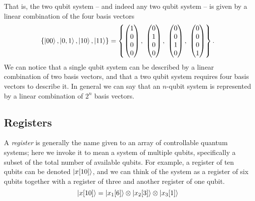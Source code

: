 That is, the two qubit system -- and indeed any two qubit system -- is given by a linear combination of the four basis vectors
\begin{equation}
    \left\{ \ket{00}, \ket{0,1}, \ket{10}, \ket{11} \right\} 
    = \left\{ \icol{1\\0\\0\\0}, \ \icol{0\\1\\0\\0}, \ \icol{0\\0\\1\\0}, \  \icol{0\\0\\0\\1} \right\}.
\end{equation}
We can notice that a single qubit system can be described by a linear combination of two basis vectors, 
    and that a two qubit system requires four basis vectors to describe it. 
In general we can say that an $n$-qubit system is represented by a linear combination of $2^n$ basis vectors. 

\subsection{Registers}
A \textit{register} is generally the name given to an array of controllable quantum systems; here we invoke it to mean a system of multiple qubits, specifically a subset of the total number of available qubits. 
For example, a register of ten qubits can be denoted $\ket{x[10]}$, and we can think of the system as a register of six qubits together with a register of three and another register of one qubit. 
$$ \ket{x[10]} = \ket{x_1[6]} \otimes \ket{x_2[3]} \otimes \ket{x_3[1]} $$



